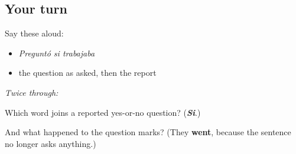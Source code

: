 \subsection*{Your turn}
Say these aloud:

\begin{itemize}
\raggedright
  \item \emph{Preguntó si trabajaba}
  \item the question as asked, then the report
\end{itemize}

\emph{Twice through:}

\begin{tcolorbox}[breakable,colback=teal!4,colframe=teal!35!black,title={Before you move on}]
Which word joins a reported yes-or-no question? (\emph{\textbf{Si}}.)

And what happened to the question marks? (They \textbf{went}, because the sentence no longer asks anything.)
\end{tcolorbox}
